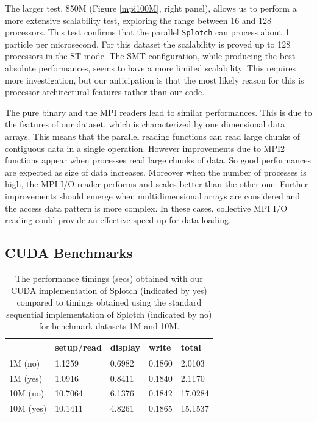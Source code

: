 The larger test, 850M (Figure \ref{mpi100M}, right panel), 
allows us to perform a more extensive scalability test, 
exploring the range between 16 and 128 processors. This test confirms that the parallel 
{\tt Splotch} can process about 1 particle per microsecond. For this dataset the scalability 
is proved up to 128 processors in the ST mode. The SMT configuration, 
while producing the best absolute performances, seems to have a more limited scalability. 
This requires more investigation, but our anticipation is that the most likely reason for this is processor 
architectural features rather than our code.

The pure binary and the MPI readers lead to similar performances. This is due to the features 
of our dataset, which is characterized by one dimensional data arrays. This means 
that the parallel reading functions can read large chunks of contiguous data 
in a single operation. However improvements due to MPI2 functions appear when 
processes read large chunks of data. So good performances are expected as size of data increases. 
Moreover when the number of processes is high, the MPI I/O reader performs and scales 
better than the other one. Further improvements should emerge when multidimensional 
arrays are considered and the access data pattern is more complex. 
In these cases, collective MPI I/O reading could provide an effective speed-up for data loading.

\subsection{CUDA Benchmarks}

\begin{table}
\caption{The performance timings (secs) obtained with our CUDA implementation of Splotch (indicated by yes) compared to timings obtained using the standard sequential implementation of Splotch (indicated by no) for benchmark datasets 1M and 10M.}
\begin{center}
\begin{tabular}{|l|l|l|l|l|}
\hline
	& setup/read & 	display & 	write & 	total \\
\hline
1M (no) & 	1.1259 & 	0.6982 & 	0.1860 & 	2.0103 \\
\hline
1M (yes) & 	1.0916 & 	0.8411 & 	0.1840 & 	2.1170 \\
\hline
10M (no) & 	10.7064 & 	6.1376 & 	0.1842 & 	17.0284 \\
\hline
10M (yes) & 	10.1411 & 	4.8261 & 	0.1865 & 	15.1537 \\
\hline
\end{tabular}
\end{center}
\end{table}

